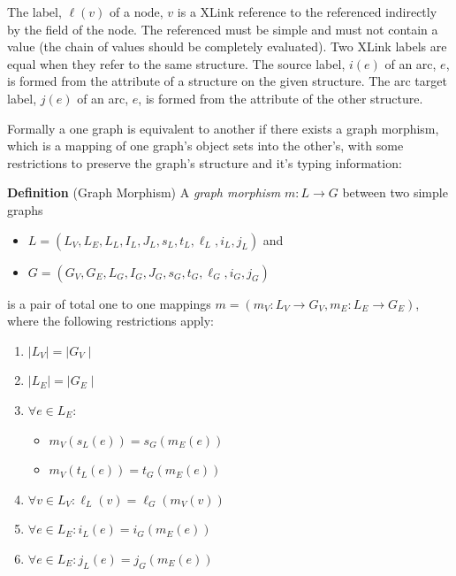 \documentclass{cekarticle}
\begin{document}
The label, $\ell(v)$ of a node, $v$ is a XLink reference to the
 referenced indirectly by the
 field of the node.  The referenced
 must be simple and must not contain a
 value (the chain of  values should be
completely evaluated).  Two XLink labels are equal when they refer
to the same  structure. The source label,
$i(e)$ of an arc, $e$, is formed from the 
attribute of a  structure on the given
 structure. The arc target label, $j(e)$ of an
arc, $e$, is formed from the  attribute of the
other  structure.

Formally a one graph is equivalent to another if there exists a
graph morphism, which is a mapping of one graph's object sets into
the other's, with some restrictions to preserve the graph's
structure and it's typing information:

\textbf{Definition} (Graph Morphism) A \emph{graph morphism} $m : L \rightarrow G$ between two
simple graphs
\begin{itemize}
\item $L = (L_{V}, L_{E}, L_{L}, I_{L}, J_{L}, s_{L}, t_{L}, \ell_{L}, i_{L}, j_{L})$ and
\item $G = (G_{V}, G_{E}, L_{G}, I_{G}, J_{G}, s_{G}, t_{G}, \ell_{G}, i_{G}, j_{G})$
\end{itemize}
is a pair of total one to one mappings $m = (m_{V} : L_{V}
\rightarrow G_{V}, m_{E} : L_{E} \rightarrow G_{E})$, where the
following restrictions apply:

\begin{enumerate}
\item $\mid L_{V} \mid = \mid G_{V} \mid$

\item $\mid L_{E} \mid = \mid G_{E} \mid$

\item $\forall e \in L_{E} : $
    \begin{itemize}
    \item $m_{V}(s_{L}(e))= s_{G}(m_{E}(e))$
    \item $m_{V}(t_{L}(e))= t_{G}(m_{E}(e))$
    \end{itemize}
\item $\forall v \in L_{V} : \ell_{L}(v) = \ell_{G}(m_{V}(v))$
\item $\forall e \in L_{E} : i_{L}(e) = i_{G}(m_{E}(e))$
\item $\forall e \in L_{E} : j_{L}(e) = j_{G}(m_{E}(e))$
\end{enumerate}
\end{document}
